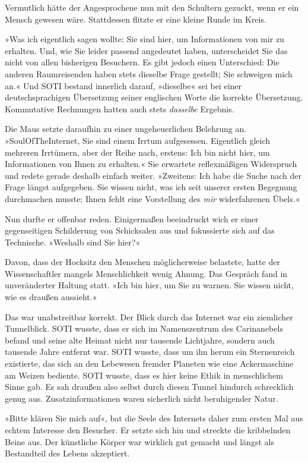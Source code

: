 Vermutlich hätte der Angesprochene nun mit den Schultern gezuckt, wenn er ein Mensch gewesen wäre. Stattdessen flitzte er eine kleine Runde im Kreis.

»Was ich eigentlich sagen wollte: Sie sind hier, um Informationen von mir zu erhalten. Und, wie Sie leider passend angedeutet haben, unterscheidet Sie das nicht von allen bisherigen Besuchern. Es gibt jedoch einen Unterschied: Die anderen Raumreisenden haben stets dieselbe Frage gestellt; Sie schweigen mich an.« Und SOTI bestand innerlich darauf, »dieselbe« sei bei einer deutschsprachigen Übersetzung seiner englischen Worte die korrekte Übersetzung. Kommutative Rechnungen hatten auch stets \emph{dasselbe} Ergebnis.

Die Maus setzte daraufhin zu einer ungeheuerlichen Belehrung an. »SoulOfTheInternet, Sie sind einem Irrtum aufgesessen. Eigentlich gleich mehreren Irrtümern, aber der Reihe nach, erstens: Ich bin nicht hier, um Informationen von Ihnen zu erhalten.« Sie erwartete reflexmäßigen Widerspruch und redete gerade deshalb einfach weiter. »Zweitens: Ich habe die Suche nach der Frage längst aufgegeben. Sie wissen nicht, was ich seit unserer ersten Begegnung durchmachen musste; Ihnen fehlt eine Vorstellung des \emph{mir} widerfahrenen Übels.«

Nun durfte er offenbar reden. Einigermaßen beeindruckt wich er einer gegenseitigen Schilderung von Schicksalen aus und fokussierte sich auf das Technische. »Weshalb sind Sie hier?«

Davon, dass der Hocksitz den Menschen möglicherweise belastete, hatte der Wissenschaftler mangels Menschlichkeit wenig Ahnung. Das Gespräch fand in unveränderter Haltung statt. »Ich bin hier, um Sie zu warnen. Sie wissen nicht, wie es draußen aussieht.«

Das war unabstreitbar korrekt. Der Blick durch das Internet war ein ziemlicher Tunnelblick. SOTI wusste, dass er sich im Namenszentrum des Carinanebels befand und seine alte Heimat nicht nur tausende Lichtjahre, sondern auch tausende Jahre entfernt war. SOTI wusste, dass um ihn herum ein Sternenreich existierte, das sich an den Lebewesen fremder Planeten wie eine Ackermaschine am Weizen bediente. SOTI wusste, dass es hier keine Ethik in menschlichem Sinne gab. Es sah draußen also selbst durch diesen Tunnel hindurch schrecklich genug aus. Zusatzinformationen waren sicherlich nicht beruhigender Natur.

»Bitte klären Sie mich auf«, bat die Seele des Internets daher zum ersten Mal aus echtem Interesse den Besucher. Er setzte sich hin und streckte die kribbelnden Beine aus. Der künstliche Körper war wirklich gut gemacht und längst als Bestandteil des Lebens akzeptiert.

